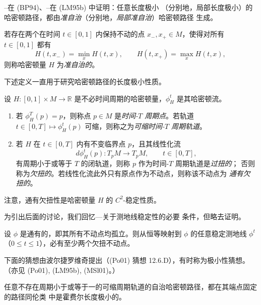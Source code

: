 \personBialy{}--\personPolterovich{}在 (BP94)、\personLalonde{}--\personMcDuff{}在 (LM95b) 中证明：任意长度极小
（分别地，局部长度极小）的哈密顿路径，都由\emph{准自治}（分别地，\emph{局部准自治}）哈密顿路径
生成。

\begin{definition}
\label{def:22-quasi-autonomous}
若存在两个在时间 $t\in[0,1]$ 内保持不动的点 $x_-,x_+\in M$，使得对所有
$t\in[0,1]$ 都有
\[
 H(t,x_-)=\min_xH(t,x),\qquad
 H(t,x_+)=\max_xH(t,x),
\]
则称哈密顿量 $H$ 为\emph{准自治的}。
\end{definition}

下述定义一直用于研究哈密顿路径的长度极小性质。

\begin{definition}
\label{def:22-twisted-periodic-point}
设 $H:[0,1]\times M\to\mathbb R$ 是不必时间周期的哈密顿量，$\phi_H^t$ 是其哈密顿流。
\begin{enumerate}
 \item 若 $\phi_H^T(p)=p$，则称点 $p\in M$ 是\emph{时间-$T$ 周期点}。若轨道
 $t\in[0,T]\mapsto\phi_H^t(p)$ 可缩，则称之为\emph{可缩时间-$T$ 周期轨道}。
 \item 若 $H$ 在 $t\in[0,T]$ 内有不变临界点 $p$，且其线性化流
 \[
  d\phi_H^t(p):T_pM\longrightarrow T_pM,\qquad t\in[0,T],
 \]
 有周期小于或等于 $T$ 的闭轨道，则称 $p$ 作为时间-$T$ 周期轨道是\emph{过扭的}；
 否则称为\emph{欠扭的}。若线性化流此外只有原点作为不动点，则称该不动点为
 \emph{通有欠扭的}。
\end{enumerate}
\end{definition}

注意，通有欠扭性是哈密顿量 $H$ 的 $C^2$-稳定性质。

为引出后面的讨论，我们回忆\personUstilovsky{}--\personLalonde{}--\personMcDuff{}关于测地线稳定性的必要
条件，但略去证明。

\begin{theorem}
\label{thm:22-stable-geodesic-fixed-points}
设 $\phi$ 是通有的，即其所有不动点均孤立。则从恒等映射到 $\phi$ 的任意稳定测地线
$\phi^t$（$0\leq t\leq1$），必有至少两个欠扭不动点。
\end{theorem}

下面的猜想由波尔捷罗维奇提出（(Po01) 猜想 12.6.D），有时称为极小性猜想。
（亦见 (Po01), (LM95b), (MSl01)。）

\begin{conjecture}[极小性猜想]
\label{conj:22-minimality}
任意不存在周期小于或等于一的可缩周期轨道的自治哈密顿路径，都在其端点固定的路径同伦类
中是霍费尔长度极小的。
\end{conjecture}

